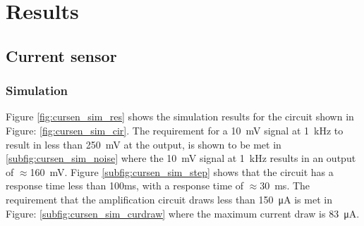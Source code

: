 \chapter{Results}\label{ch:results}
\section{Current sensor} \label{sec:current_sense_results}

\subsection{Simulation}

Figure \ref{fig:cursen_sim_res} shows the simulation results for the circuit shown in Figure: \ref{fig:cursen_sim_cir}. The requirement for a \SI{10}{\milli\volt} signal at \SI{1}{\kilo\hertz} to result in less than \SI{250}{\milli\volt} at the output, is shown to be met in \ref{subfig:cursen_sim_noise} where the \SI{10}{\milli\volt} signal at \SI{1}{\kilo\hertz} results in an output of $\approx$\SI{160}{\milli\volt}. Figure \ref{subfig:cursen_sim_step} shows that the circuit has a response time less than 100ms, with a response time of $\approx$\SI{30}{\milli\second}. The requirement that the amplification circuit draws less than \SI{150}{\micro\ampere} is met in Figure: \ref{subfig:cursen_sim_curdraw} where the maximum current draw is \SI{83}{\micro\ampere}.

